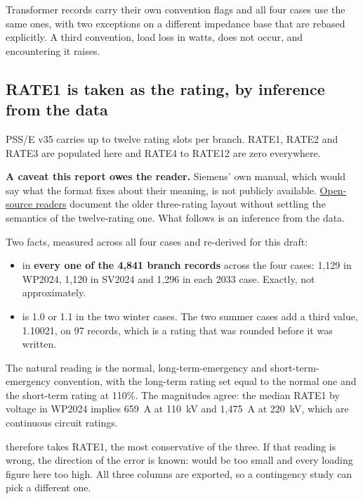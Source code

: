 \documentclass[11pt,a4paper]{article}
\begin{document}
Transformer records carry their own convention flags and all four cases use the
same ones, with two exceptions on a different impedance base that are rebased
explicitly. A third convention, load loss in watts, does not occur, and
encountering it raises.


\subsection{RATE1 is taken as the rating, by inference from the data}
\label{sec:rate}

PSS/E v35 carries up to twelve rating slots per branch. RATE1, RATE2 and RATE3
are populated here and RATE4 to RATE12 are zero everywhere.

\textbf{A caveat this report owes the reader.} Siemens' own manual, which would
say what the format fixes about their meaning, is not publicly available.
\href{https://powsybl.readthedocs.io/projects/powsybl-core/en/latest/grid_exchange_formats/psse/}{Open-source readers} document the older three-rating layout without settling
the semantics of the twelve-rating one. What follows is an inference from the
data.

Two facts, measured across all four cases and re-derived for this draft:

\begin{itemize}
\item {} in \textbf{every one of the 4{,}841 branch records}
      across the four cases: 1{,}129 in WP2024, 1{,}120 in SV2024 and 1{,}296
      in each 2033 case. Exactly, not approximately.
\item {} is 1.0 or 1.1 in the two winter cases. The two summer
      cases add a third value, 1.10021, on 97 records, which is a rating that
      was rounded before it was written.
\end{itemize}

The natural reading is the normal, long-term-emergency and
short-term-emergency convention, with the long-term rating set equal to the
normal one and the short-term rating at 110\%. The magnitudes agree: the median
RATE1 by voltage in WP2024 implies 659~A at 110~kV and 1{,}475~A at 220~kV,
which are continuous circuit ratings.

 therefore takes RATE1, the most conservative of the three. If
that reading is wrong, the direction of the error is known:  would
be too small and every loading figure here too high. All three columns are
exported, so a contingency study can pick a different one.
\end{document}

